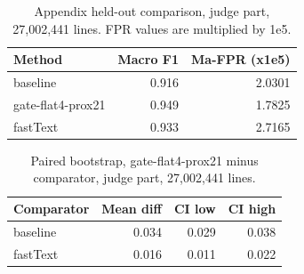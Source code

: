 \begin{table}[htbp]
\centering
\small
\begin{tabular}{lrr}
\toprule
\textbf{Method} & \textbf{Macro F1} & \textbf{Ma-FPR (x1e5)} \\
\midrule
baseline & 0.916 & 2.0301 \\
gate-flat4-prox21 & 0.949 & 1.7825 \\
fastText & 0.933 & 2.7165 \\
\bottomrule
\end{tabular}
\caption{Appendix held-out comparison, judge part, 27,002,441 lines. FPR values are multiplied by 1e5.}
\label{tab:paper_eval_appendix}
\end{table}

\begin{table}[htbp]
\centering
\small
\begin{tabular}{lrrr}
\toprule
\textbf{Comparator} & \textbf{Mean diff} & \textbf{CI low} & \textbf{CI high} \\
\midrule
baseline & 0.034 & 0.029 & 0.038 \\
fastText & 0.016 & 0.011 & 0.022 \\
\bottomrule
\end{tabular}
\caption{Paired bootstrap, gate-flat4-prox21 minus comparator, judge part, 27,002,441 lines.}
\label{tab:paper_eval_bootstrap}
\end{table}
